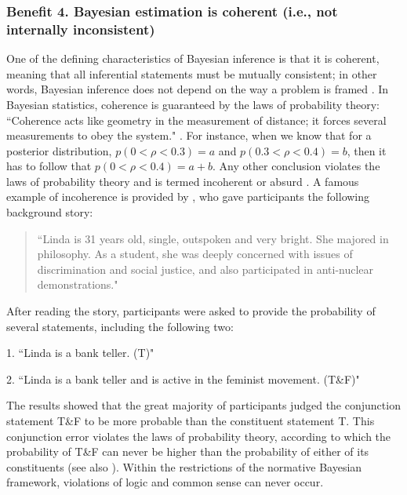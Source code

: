 \subsubsection{Benefit 4. Bayesian estimation is coherent (i.e., not internally inconsistent)}
One of the defining characteristics of Bayesian inference is that it is coherent, meaning that all inferential statements must be mutually consistent; in other words, Bayesian inference does not depend on the way a problem is framed \cite{deFinetti1974,Lindley1985,Lindley2006,Ramsey1926}. In Bayesian statistics, coherence is guaranteed by the laws of probability theory: ``Coherence acts like geometry in the measurement of distance; it forces several measurements to obey the system." \cite[p. 306]{Lindley2000}. For instance, when we know that for a posterior distribution, $p(0 < \rho < 0.3) = a$ and $p(0.3 < \rho < 0.4) = b$, then it has to follow that $p(0 < \rho <0.4) = a + b$. Any other conclusion violates the laws of probability theory and is termed incoherent or absurd \cite{Lindley1985}. A famous example of incoherence is provided by , who gave participants the following background story:
\begin{quotation}
``Linda is 31 years old, single, outspoken and very bright. She majored in philosophy. As a student, she was deeply concerned with issues of discrimination and social justice, and also participated in anti-nuclear demonstrations."
\end{quotation}
After reading the story, participants were asked to provide the probability of several statements, including the following two:
\begin{description}
\item{1.} ``Linda is a bank teller. (T)"
\item{2.} ``Linda is a bank teller and is active in the feminist movement. (T\&F)"
\end{description}
The results showed that the great majority of participants judged the conjunction statement T\&F to be more probable than the constituent statement T. This conjunction error violates the laws of probability theory, according to which the probability of T\&F can never be higher than the probability of either of its constituents (see also ). Within the restrictions of the normative Bayesian framework, violations of logic and common sense can never occur.

